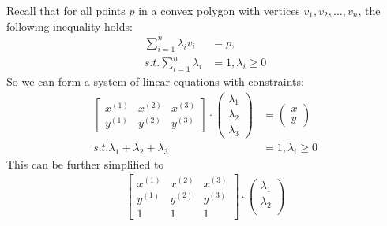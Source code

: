 \documentclass[conference,onecolumn]{IEEEtran}
\begin{document}
\begin{enumerate}[label=\arabic{enumi}.]
\begin{enumerate}
                    Recall that for all points $p$ in a convex polygon with vertices $v_1, v_2, \ldots, v_n$, the following inequality holds:
                    \begin{align*}
                        \sum_{i=1}^{n} \lambda_i v_i  & = p,                  \\
                        s.t. \sum_{i=1}^{n} \lambda_i & = 1, \lambda_i \geq 0
                    \end{align*}
                    So we can form a system of linear equations with constraints:
                    \begin{align*}
                        \begin{bmatrix}
                            x^{(1)} & x^{(2)} & x^{(3)} \\
                            y^{(1)} & y^{(2)} & y^{(3)}
                        \end{bmatrix} \cdot
                        \begin{pmatrix}
                            \lambda_1 \\
                            \lambda_2 \\
                            \lambda_3
                        \end{pmatrix}             & =
                        \begin{pmatrix}
                            x \\
                            y
                        \end{pmatrix}                                     \\
                        s.t. \lambda_1 + \lambda_2 + \lambda_3 & = 1, \lambda_i \geq 0
                    \end{align*}
                    This can be further simplified to
                    \begin{align*}
                        \begin{bmatrix}
                            x^{(1)} & x^{(2)} & x^{(3)} \\
                            y^{(1)} & y^{(2)} & y^{(3)} \\
                            1       & 1       & 1
                        \end{bmatrix} \cdot
                        \begin{pmatrix}
                            \lambda_1 \\
                            \lambda_2 \\

\end{pmatrix}
\end{align*}
\end{enumerate}
\end{enumerate}
\end{document}
